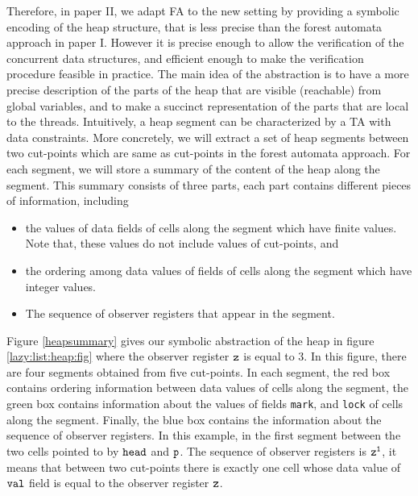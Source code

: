 Therefore, in paper II, we adapt FA to the new setting by providing a symbolic encoding of the heap structure, that is less precise than the forest automata approach in paper I. However it is precise enough to allow the verification of the concurrent data structures, and efficient enough to make the verification procedure feasible in practice.
The main idea of the abstraction is to have a more precise description of the parts of the heap that are visible (reachable) from global variables, and to make a succinct representation of the parts that are local to the threads. Intuitively, a heap segment can be characterized by a TA with data constraints. More concretely, we will extract a set of heap segments between two cut-points which are same as cut-points in the forest automata approach. For each segment, we will store a summary of the content of the heap along the segment. This summary consists of three parts, each part contains different pieces of information, including 
\begin{itemize}
\item the values of data fields of cells along the segment which have finite values. Note that, these values do not include values of cut-points, and
\item the ordering among data values of fields of cells along the segment which have integer values. 
\item The sequence of observer registers that appear in the segment. 
\end{itemize}
	
Figure \ref{heapsummary} gives our symbolic abstraction of the heap in figure \ref{lazy:list:heap:fig} where the observer register $\tt z$ is equal to 3. In this figure, there are four segments obtained from five cut-points. In each segment, the red box contains ordering information between data values of cells along the segment, the green box contains information about the values of fields {\tt mark}, and {\tt lock} of cells along the segment. Finally, the blue box contains the information about the sequence of observer registers. In this example, in the first segment between the two cells pointed to by $\tt head$ and $\tt p$. The sequence of observer registers is $\tt z^1$, it means that between two cut-points there is exactly one cell whose data value of $\tt val$ field is equal to the observer register $\tt z$.
